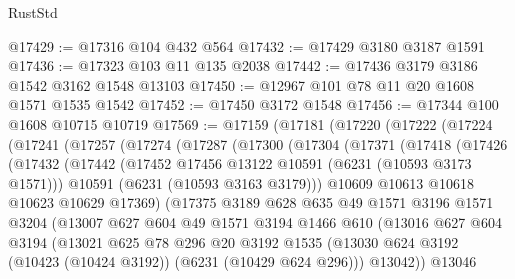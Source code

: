 \begin{lexlean}{RustStd}
\begin{coremodule}
{{@17429 := @17316 @104 @432 @564
@17432 := @17429 @3180 @3187 @1591
@17436 := @17323 @103 @11 @135 @2038
@17442 := @17436 @3179 @3186 @1542 @3162 @1548 @13103
@17450 := @12967 @101 @78 @11 @20 @1608 @1571 @1535 @1542
@17452 := @17450 @3172 @1548
@17456 := @17344 @100 @1608 @10715 @10719
@17569 := @17159
    (@17181
      (@17220
        (@17222
          (@17224
            (@17241
              (@17257
                (@17274
                  (@17287
                    (@17300
                      (@17304
                        (@17371
                          (@17418
                            (@17426
                              (@17432
                                (@17442
                                  (@17452 @17456 @13122 @10591 (@6231 (@10593 @3173 @1571)))
                                  @10591
                                  (@6231 (@10593 @3163 @3179)))
                                @10609
                                @10613
                                @10618
                                @10623
                                @10629
                                @17369)
                              (@17375
                                @3189
                                @628
                                @635
                                @49
                                @1571
                                @3196
                                @1571
                                @3204
                                (@13007
                                  @627
                                  @604
                                  @49
                                  @1571
                                  @3194
                                  @1466
                                  @610
                                  (@13016
                                    @627
                                    @604
                                    @3194
                                    (@13021
                                      @625
                                      @78
                                      @296
                                      @20
                                      @3192
                                      @1535
                                      (@13030
                                        @624
                                        @3192
                                        (@10423 (@10424 @3192))
                                        (@6231 (@10429 @624 @296)))
                                      @13042))
                                  @13046
}}
\end{coremodule}
\end{lexlean}
